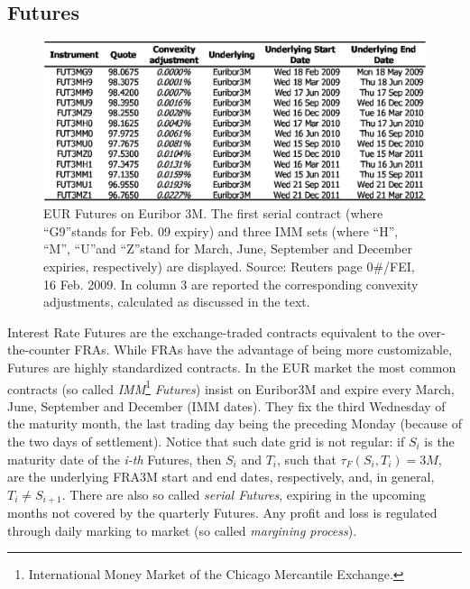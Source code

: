 \documentclass[11pt,reqno]{amsart}
\begin{document}
\subsection{Futures}
\label{sec:Futures}
\begin{figure}[tbp]
\centering
\includegraphics[scale=0.9]{../figures/FigMktFut3M}
\caption{EUR Futures on Euribor 3M. The first serial contract (where \textquotedblleft G9\textquotedblright stands for Feb. 09 expiry) and three IMM sets (where \textquotedblleft H\textquotedblright, \textquotedblleft M\textquotedblright, \textquotedblleft U\textquotedblright and \textquotedblleft Z\textquotedblright stand for March, June, September and December expiries, respectively) are displayed. Source: Reuters page 0\#/FEI, 16 Feb. 2009. In column 3 are reported the corresponding convexity adjustments, calculated as discussed in the text.}
\label{fig:Futures3M}
\end{figure}
Interest Rate Futures are the exchange-traded contracts equivalent to the over-the-counter FRAs. While FRAs have the advantage of being more customizable, Futures are highly standardized contracts. In the EUR market the most common contracts (so called \emph{IMM}\footnote{International Money Market of the Chicago Mercantile Exchange.} \emph{Futures}) insist on Euribor3M and expire every March, June, September and December (IMM dates). They fix the third Wednesday of the maturity month, the last trading day being the preceding Monday (because of the two days of settlement). Notice that  such date grid is not regular: if $S_i$ is the maturity date of the \textit{i-th} Futures, then $S_i$ and $T_i$, such that $\tau_F\left(S_i,T_i\right)=3M$, are the underlying FRA3M start and end dates, respectively, and, in general, $T_i\neq S_{i+1}$.
There are also so called \emph{serial Futures}, expiring in the upcoming months not covered by the quarterly Futures. Any profit and loss is regulated through daily marking to market (so called \emph{margining process}).
\par
\end{document}
